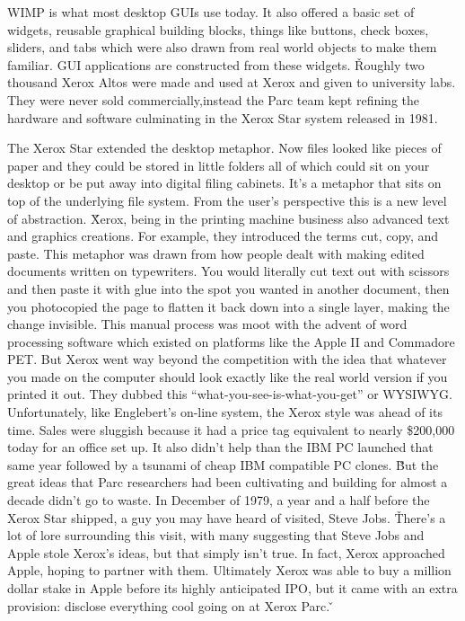 WIMP is what most desktop GUIs use today. It also offered a basic set of widgets, reusable graphical building blocks,
things like buttons, check boxes, sliders, and tabs which were also drawn from real world objects to make them
familiar. GUI applications are constructed from these widgets. \v

Roughly two thousand Xerox Altos were made and used at Xerox and given to university labs. They were never sold
commercially,instead the Parc team kept refining the hardware and software culminating in the Xerox Star system
released in 1981.


The Xerox Star extended the desktop metaphor. Now files looked like pieces of paper and they could be stored in
little folders all of which could sit on your desktop or be put away into digital filing cabinets. It's a metaphor
that sits on top of the underlying file system. From the user's perspective this is a new level of abstraction. \v

Xerox, being in the printing machine business also advanced text and graphics creations. For example, they introduced
the terms cut, copy, and paste. This metaphor was drawn from how people dealt with making edited documents written on
typewriters. You would literally cut text out with scissors and then paste it with glue into the spot you wanted in
another document, then you photocopied the page to flatten it back down into a single layer, making the change
invisible. This manual process was moot with the advent of word processing software which existed on platforms like
the Apple II and Commadore PET. But Xerox went way beyond the competition with the idea that whatever you made on the
computer should look exactly like the real world version if you printed it out. They dubbed this
``what-you-see-is-what-you-get'' or WYSIWYG. Unfortunately, like Englebert's on-line system, the Xerox style was
ahead of its time. Sales were sluggish because it had a price tag equivalent to nearly \$200,000 today for an office
set up. It also didn't help than the IBM PC launched that same year followed by a tsunami of cheap IBM compatible PC
clones. \v

But the great ideas that Parc researchers had been cultivating and building for almost a decade didn't go to waste.
In December of 1979, a year and a half before the Xerox Star shipped, a guy you may have heard of visited, Steve Jobs. \v

There's a lot of lore surrounding this visit, with many suggesting that Steve Jobs and Apple stole Xerox's ideas, but
that simply isn't true. In fact, Xerox approached Apple, hoping to partner with them. Ultimately Xerox was able to
buy a million dollar stake in Apple before its highly anticipated IPO, but it came with an extra provision: disclose
everything cool going on at Xerox Parc. \v

